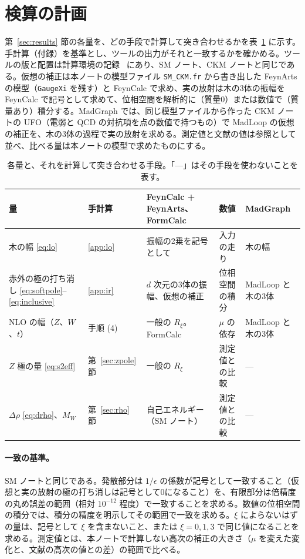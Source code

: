 \documentclass[a4paper,10pt]{ltjsarticle}
\begin{document}
\section{検算の計画}\label{sec:plan}

第~\ref{sec:results} 節の各量を、どの手段で計算して突き合わせるかを表~\ref{tab:plan} に示す。手計算（付録）を基準とし、ツールの出力がそれと一致するかを確かめる。ツールの版と配置は計算環境の記録~\cite{env} にあり、SM ノート、CKM ノートと同じである。仮想の補正は本ノートの模型ファイル \texttt{SM\_CKM.fr} から書き出した FeynArts の模型（\texttt{GaugeXi} を残す）と FeynCalc で求め、実の放射は木の3体の振幅を FeynCalc で記号として求めて、位相空間を解析的に（質量0）または数値で（質量あり）積分する。MadGraph では、同じ模型ファイルから作った CKM ノートの UFO（電弱と QCD の対抗項を点の数値で持つもの）で MadLoop の仮想の補正を、木の3体の過程で実の放射を求める。測定値と文献の値は参照として並べ、比べる量は本ノートの模型で求めたものにする。

\begin{table}[htbp]
\centering\small
\caption{各量と、それを計算して突き合わせる手段。「—」はその手段を使わないことを表す。}
\label{tab:plan}
\begin{tabularx}{\linewidth}{>{\raggedright\arraybackslash}p{3.6cm}>{\raggedright\arraybackslash}p{1.3cm}>{\raggedright\arraybackslash}X>{\raggedright\arraybackslash}p{2.0cm}>{\raggedright\arraybackslash}p{2.2cm}}
\toprule
\textbf{量} & \textbf{手計算} & \textbf{FeynCalc + FeynArts、FormCalc} & \textbf{数値} & \textbf{MadGraph} \\
\midrule
木の幅 \eqref{eq:lo} & \ref{app:lo} & 振幅の2乗を記号として & 入力の走り & 木の幅 \\
赤外の極の打ち消し \eqref{eq:softpole}--\eqref{eq:inclusive} & \ref{app:ir} & $d$ 次元の3体の振幅、仮想の補正 & 位相空間の積分 & MadLoop と木の3体 \\
NLO の幅（$Z$、$W$、$t$） & 手順 (4) & 一般の $R_\xi$。FormCalc & $\mu$ の依存 & MadLoop と木の3体 \\
$Z$ 極の量 \eqref{eq:s2eff} & 第~\ref{sec:zpole} 節 & 一般の $R_\xi$ & 測定値との比較 & — \\
$\Delta\rho$ \eqref{eq:drho}、$M_W$ & 第~\ref{sec:rho} 節 & 自己エネルギー（SM ノート） & 測定値との比較 & — \\
\bottomrule
\end{tabularx}
\end{table}

\paragraph{一致の基準。}SM ノートと同じである。発散部分は $1/\epsilon$ の係数が記号として一致すること（仮想と実の放射の極の打ち消しは記号として0になること）を、有限部分は倍精度の丸め誤差の範囲（相対 $10^{-12}$ 程度）で一致することを求める。数値の位相空間の積分では、積分の精度を明示してその範囲で一致を求める。$\xi$ によらないはずの量は、記号として $\xi$ を含まないこと、または $\xi=0,1,3$ で同じ値になることを求める。測定値とは、本ノートで計算しない高次の補正の大きさ（$\mu$ を変えた変化と、文献の高次の値との差）の範囲で比べる。
\end{document}

